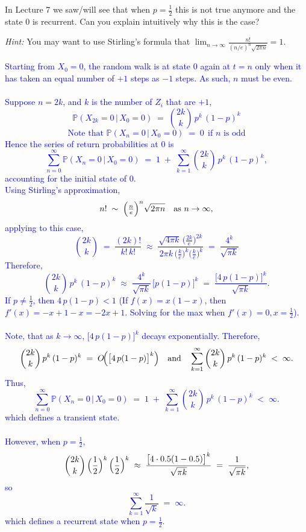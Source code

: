 \documentclass{article}
\begin{document}
    In Lecture 7 we saw/will see that when $p = \frac{1}{2}$ this is not true anymore and the state 0 is recurrent. Can you explain intuitively why this is the case?

    \textit{Hint:} You may want to use Stirling’s formula that $\lim_{n \to \infty} \frac{n!}{(n/e)^n \sqrt{2\pi n}} = 1$.


    \textcolor{blue}{
Starting from \(X_0 = 0\), the random walk is at state \(0\) again at \(t=n\) only when it has taken an equal number of \(+1\) steps as \(-1\) steps. As such, \(n\) must be even. \\ \\ Suppose \(n = 2k\), and \(k\) is the number of \(Z_i\) that are \(+1\),
\[
  \mathbb{P}(X_{2k} = 0 \,\big\vert\, X_0 = 0)
  \;=\;
  \binom{2k}{k}\, p^k\, (1-p)^k
\]
\[
    \text{Note that }\mathbb{P}(X_n = 0 \,\big\vert\, X_0 = 0) \;=\; 0
  \ \ \text{if $n$ is odd}
\]
Hence the series of return probabilities at \(0\) is
\[
  \sum_{n=0}^\infty \mathbb{P}(X_n = 0 \,\big\vert\, X_0 = 0)
  \;=\;
  1 \;+\; \sum_{k=1}^\infty \binom{2k}{k}\, p^k\, (1-p)^k,
\]
accounting for the initial state of 0. \\ Using Stirling's approximation,
\medskip
\noindent
\[
  n! \;\sim\; \Bigl(\tfrac{n}{e}\Bigr)^{n}\sqrt{2\pi n}
  \quad\text{as }n \to \infty,
\]
applying to this case,
\[
  \binom{2k}{k}
  \;=\;
  \frac{(2k)!}{k!\,k!}
  \;\approx\;
  \frac{\sqrt{4\pi k}\,\bigl(\tfrac{2k}{e}\bigr)^{2k}}{\,2\pi k\,\bigl(\tfrac{k}{e}\bigr)^{k}\bigl(\tfrac{k}{e}\bigr)^{k}}
  \;=\;
  \frac{4^k}{\sqrt{\pi k}}
\]
Therefore,
\[
  \binom{2k}{k}\,p^k\,(1-p)^k
  \;\approx\;
  \frac{4^k}{\sqrt{\pi k}} \,\bigl[p(1-p)\bigr]^k
  \;=\;
  \frac{\bigl[4\,p(1-p)\bigr]^k}{\sqrt{\pi k}}.
\]
\medskip
\noindent
If $p \neq \frac{1}{2}$, then \(4\,p(1-p) < 1\) (If $f(x)=x(1-x)$, then $f'(x)=-x+1-x=-2x+1$. Solving for the max when $f'(x)=0, x=\frac{1}{2}$). \\ \\ 
Note, that as \(k \to \infty\), \(\bigl[4\,p(1-p)\bigr]^k\) decays exponentially. Therefore,
\[
  \binom{2k}{k}\,p^k\,(1-p)^k
  \;=\;
  O\!\Bigl(\bigl[4\,p(1-p)\bigr]^k\Bigr)
  \quad
  \text{and}
  \quad
  \sum_{k=1}^{\infty} \binom{2k}{k}\,p^k\,(1-p)^k
  \;<\;\infty.
\]
Thus,
\[
  \sum_{n=0}^\infty \mathbb{P}(X_n = 0 \,\big\vert\, X_0 = 0)
  \;=\;
  1 \;+\;
  \sum_{k=1}^{\infty}
  \binom{2k}{k}\, p^k\,(1-p)^k
  \;<\;
  \infty.
\]
which defines a transient state. \\ \\ 
\medskip
\noindent
However, when \(p = \frac{1}{2}\),
\[
  \binom{2k}{k}\,\Bigl(\frac12\Bigr)^k\,\Bigl(\frac12\Bigr)^k
  \;\approx\;
    \frac{\bigl[4\cdot 0.5(1-0.5)\bigr]^k}{\sqrt{\pi k}}
  \;=\;
  \frac{1}{\sqrt{\pi k}},
\]
so
\[
  \sum_{k=1}^\infty \frac{1}{\sqrt{k}}
  \;=\;
  \infty.
\]
which defines a recurrent state when $p=\frac12$. }
\end{document}
